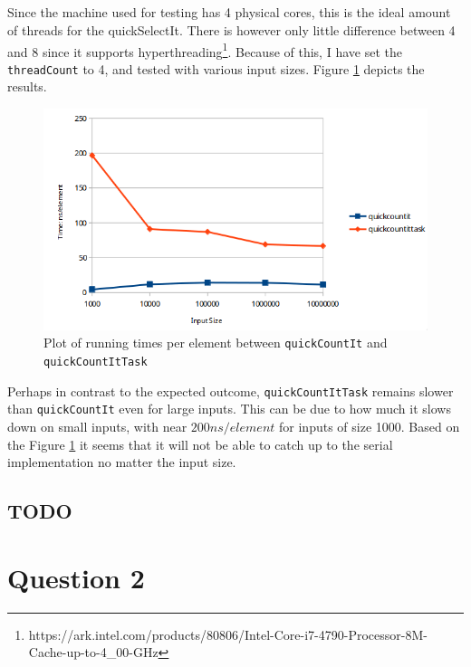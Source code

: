 \documentclass[a5paper]{article}
\begin{document}
\subsection{}
Since the machine used for testing has 4 physical cores, this is the ideal amount of threads for the quickSelectIt. There is however only little difference between 4 and 8 since it supports hyperthreading\footnote{https://ark.intel.com/products/80806/Intel-Core-i7-4790-Processor-8M-Cache-up-to-4\_00-GHz}. Because of this, I have set the \texttt{threadCount} to 4, and tested with various input sizes. Figure \ref{fig:compTask} depicts the results. 
\begin{figure}[!ht]
    \centering
    \noindent\includegraphics[scale=0.5]{res/graph_task.png}
    \caption{Plot of running times per element between \texttt{quickCountIt} and \texttt{quickCountItTask}}
    \label{fig:compTask}
\end{figure}

Perhaps in contrast to the expected outcome, \texttt{quickCountItTask} remains slower than \texttt{quickCountIt} even for large inputs. This can be due to how much it slows down on small inputs, with near $200ns/element$ for inputs of size 1000. Based on the Figure \ref{fig:compTask} it seems that it will not be able to catch up to the serial implementation no matter the input size.

\subsection{}
\subsection{TODO}


\section{Question 2}
\end{document}
